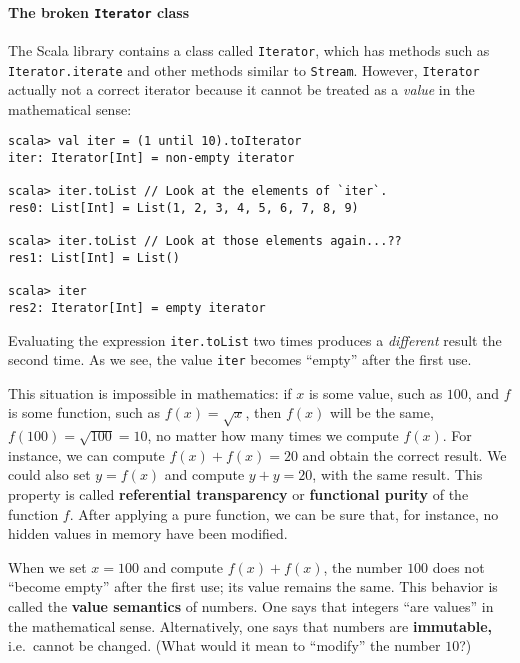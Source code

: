 \paragraph{The broken \texttt{Iterator} class}

The Scala library contains a class called \lstinline!Iterator!, which
has methods such as \lstinline!Iterator.iterate! and other methods
similar to \lstinline!Stream!. However, \lstinline!Iterator! actually
not a correct iterator because it cannot be treated as a \emph{value}
in the mathematical sense:
\begin{lstlisting}
scala> val iter = (1 until 10).toIterator
iter: Iterator[Int] = non-empty iterator

scala> iter.toList // Look at the elements of `iter`.
res0: List[Int] = List(1, 2, 3, 4, 5, 6, 7, 8, 9)

scala> iter.toList // Look at those elements again...??
res1: List[Int] = List()

scala> iter
res2: Iterator[Int] = empty iterator
\end{lstlisting}
Evaluating the expression \lstinline!iter.toList! two times produces
a \emph{different} result the second time. As we see, the value \lstinline!iter!
becomes ``empty'' after the first use.

This situation is impossible in mathematics: if $x$ is some value,
such as $100$, and $f$ is some function, such as $f(x)=\sqrt{x}$,
then $f(x)$ will be the same, $f(100)=\sqrt{100}=10$, no matter
how many times we compute $f(x)$. For instance, we can compute $f(x)+f(x)=20$
and obtain the correct result. We could also set $y=f(x)$ and compute
$y+y=20$, with the same result. This property is called \textbf{referential
transparency} or \textbf{functional purity}
of the function $f$. After applying a pure function, we can be sure
that, for instance, no hidden values in memory have been modified.

When we set $x=100$ and compute $f(x)+f(x)$, the number $100$ does
not ``become empty'' after the first use; its value remains the
same. This behavior is called the \textbf{value
semantics} of numbers. One says that integers ``are values'' in
the mathematical sense. Alternatively, one says that numbers are \textbf{immutable,}
i.e.~cannot be changed. (What would it mean to ``modify'' the number
$10$?)

